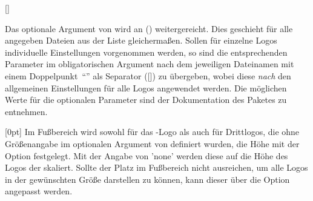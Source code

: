 \begin{Declaration*}{}
\begin{Declaration*}{}
\begin{Declaration*}{}
\begin{Declaration}[v2.03]{%
  [\LParameter{}]%
}
\begin{Declaration}[v2.03]{}
Das optionale Argument von  wird an 
() weitergereicht. Dies geschieht für 
alle angegeben Dateien aus der Liste gleichermaßen. Sollen für einzelne Logos 
individuelle Einstellungen vorgenommen werden, so sind die entsprechenden 
Parameter im obligatorischen Argument nach dem jeweiligen Dateinamen mit einem 
Doppelpunkt~\enquote{\PValue{:}} als Separator 
([]) zu 
übergeben, wobei diese \emph{nach} den allgemeinen Einstellungen für alle Logos 
angewendet werden. Die möglichen Werte für die optionalen Parameter sind der 
Dokumentation des Paketes  zu entnehmen.
\end{Declaration}
\end{Declaration}

\begin{Declaration}[v2.05]{}[0pt]%
\printdeclarationlist%
%
Im Fußbereich wird sowohl für das \DDC-Logo als auch für Drittlogos, die ohne 
Größenangabe im optionalen Argument von  definiert wurden, die 
Höhe mit der Option  festgelegt. Mit der Angabe 
von  'none' werden diese auf die Höhe des Logos der 
\TnUD skaliert. Sollte der Platz im Fußbereich nicht ausreichen, um alle Logos 
in der gewünschten Größe darstellen zu können, kann dieser über die Option
 angepasst werden.
\end{Declaration}


\end{Declaration*}
\end{Declaration*}
\end{Declaration*}
